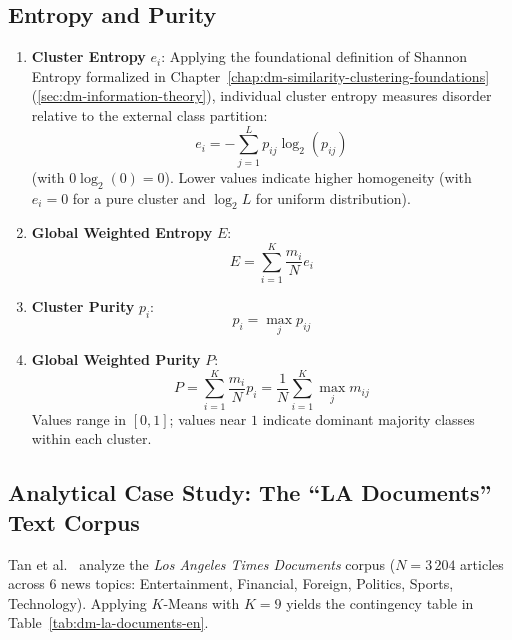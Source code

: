 \subsection{Entropy and Purity}
\begin{enumerate}
    \item \textbf{Cluster Entropy} $e_i$: Applying the foundational definition of Shannon Entropy formalized in Chapter~\ref{chap:dm-similarity-clustering-foundations} (\autoref{sec:dm-information-theory}), individual cluster entropy measures disorder relative to the external class partition:
    \begin{equation}
    \label{eq:dm-entropy-single-en}
    e_i = - \sum_{j=1}^L p_{ij} \log_2(p_{ij})
    \end{equation}
    (with $0 \log_2(0) = 0$). Lower values indicate higher homogeneity (with $e_i = 0$ for a pure cluster and $\log_2 L$ for uniform distribution).
    
    \item \textbf{Global Weighted Entropy} $E$:
    \begin{equation}
    \label{eq:dm-entropy-global-en}
    E = \sum_{i=1}^K \frac{m_i}{N} e_i
    \end{equation}
    
    \item \textbf{Cluster Purity} $p_i$:
    \begin{equation}
    \label{eq:dm-purity-single-en}
    p_i = \max_j p_{ij}
    \end{equation}
    
    \item \textbf{Global Weighted Purity} $P$:
    \begin{equation}
    \label{eq:dm-purity-global-en}
    P = \sum_{i=1}^K \frac{m_i}{N} p_i = \frac{1}{N} \sum_{i=1}^K \max_j m_{ij}
    \end{equation}
    Values range in $[0, 1]$; values near $1$ indicate dominant majority classes within each cluster.
\end{enumerate}

\subsection{Analytical Case Study: The ``LA Documents'' Text Corpus}
Tan et al.~\cite{tan2018} analyze the \textit{Los Angeles Times Documents} corpus ($N = 3\,204$ articles across 6 news topics: Entertainment, Financial, Foreign, Politics, Sports, Technology).
Applying $K$-Means with $K=9$ yields the contingency table in Table~\ref{tab:dm-la-documents-en}.

